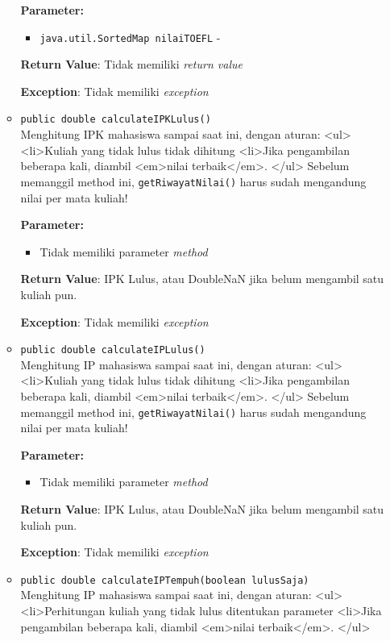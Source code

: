 \documentclass{article}
\begin{document}
\begin{enumerate}
\begin{itemize}
\textbf{Parameter:}\begin{itemize}
\item \texttt{java.util.SortedMap nilaiTOEFL} - 
\end{itemize}
\textbf{Return Value}: Tidak memiliki \textit{return value}

\textbf{Exception}: Tidak memiliki \textit{exception}

\item \texttt{public double calculateIPKLulus()}\\ 
Menghitung IPK mahasiswa sampai saat ini, dengan aturan:
 <ul>
   <li>Kuliah yang tidak lulus tidak dihitung
   <li>Jika pengambilan beberapa kali, diambil <em>nilai terbaik</em>.
 </ul>
 Sebelum memanggil method ini, \texttt{getRiwayatNilai()} harus sudah mengandung nilai per mata kuliah!

\textbf{Parameter:}\begin{itemize}
\item Tidak memiliki parameter \textit{method}
\end{itemize}
\textbf{Return Value}: IPK Lulus, atau  DoubleNaN jika belum mengambil satu kuliah pun.

\textbf{Exception}: Tidak memiliki \textit{exception}

\item \texttt{public double calculateIPLulus()}\\ 
Menghitung IP mahasiswa sampai saat ini, dengan aturan:
 <ul>
   <li>Kuliah yang tidak lulus tidak dihitung
   <li>Jika pengambilan beberapa kali, diambil <em>nilai terbaik</em>.
 </ul>
 Sebelum memanggil method ini, \texttt{getRiwayatNilai()} harus sudah mengandung nilai per mata kuliah!

\textbf{Parameter:}\begin{itemize}
\item Tidak memiliki parameter \textit{method}
\end{itemize}
\textbf{Return Value}: IPK Lulus, atau  DoubleNaN jika belum mengambil satu kuliah pun.

\textbf{Exception}: Tidak memiliki \textit{exception}

\item \texttt{public double calculateIPTempuh(boolean lulusSaja)}\\ 
Menghitung IP mahasiswa sampai saat ini, dengan aturan:
 <ul>
   <li>Perhitungan kuliah yang tidak lulus ditentukan parameter
   <li>Jika pengambilan beberapa kali, diambil <em>nilai terbaik</em>.
 </ul>


\end{itemize}
\end{enumerate}
\end{document}
